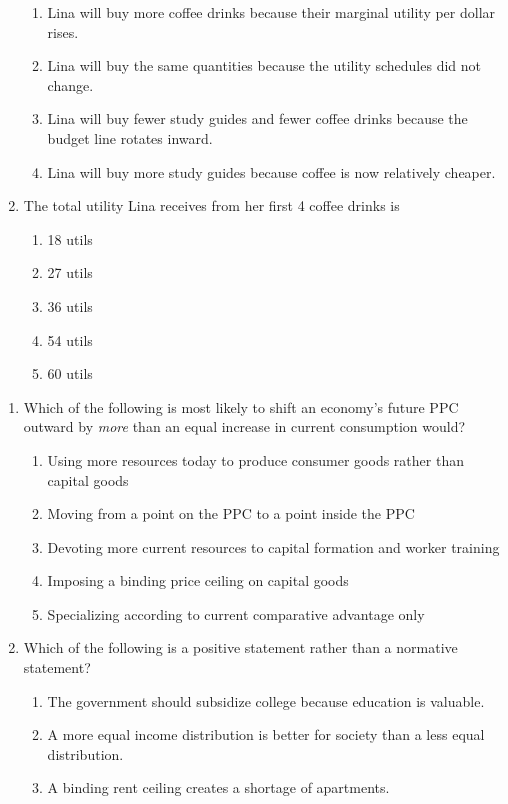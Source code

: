 \documentclass[10pt]{article}
\newenvironment{choiceslist}
  {\begin{enumerate}[label=(\Alph*), leftmargin=1.6em, itemsep=0.12em, topsep=0.18em, parsep=0pt]}
  {\end{enumerate}}
\begin{document}
\begin{multicols*}{2}
\begin{enumerate}[resume*=apq, leftmargin=*, itemsep=0.85em, topsep=0.2em, parsep=0pt]
\begin{choiceslist}
\item Lina will buy more coffee drinks because their marginal utility per dollar rises.
\item Lina will buy the same quantities because the utility schedules did not change.
\item Lina will buy fewer study guides and fewer coffee drinks because the budget line rotates inward.
\item Lina will buy more study guides because coffee is now relatively cheaper.
\end{choiceslist}
\item The total utility Lina receives from her first 4 coffee drinks is
\begin{choiceslist}
\item 18 utils
\item 27 utils
\item 36 utils
\item 54 utils
\item 60 utils
\end{choiceslist}
\end{enumerate}
\begin{enumerate}[resume*=apq, leftmargin=*, itemsep=0.85em, topsep=0.2em, parsep=0pt]
\item Which of the following is most likely to shift an economy's future PPC outward by \emph{more} than an equal increase in current consumption would?
\begin{choiceslist}
\item Using more resources today to produce consumer goods rather than capital goods
\item Moving from a point on the PPC to a point inside the PPC
\item Devoting more current resources to capital formation and worker training
\item Imposing a binding price ceiling on capital goods
\item Specializing according to current comparative advantage only
\end{choiceslist}
\item Which of the following is a positive statement rather than a normative statement?
\begin{choiceslist}
\item The government should subsidize college because education is valuable.
\item A more equal income distribution is better for society than a less equal distribution.
\item A binding rent ceiling creates a shortage of apartments.

\end{choiceslist}
\end{enumerate}
\end{multicols*}
\end{document}
